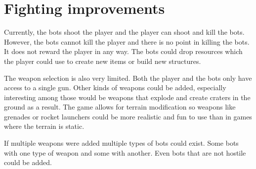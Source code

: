 \section{Fighting improvements}
Currently, the bots shoot the player and the player can shoot and kill the bots.
However, the bots cannot kill the player and there is no point in killing the bots.
It does not reward the player in any way.
The bots could drop resources which the player could use to create new items or build new structures.

The weapon selection is also very limited.
Both the player and the bots only have access to a single gun.
Other kinds of weapons could be added, especially interesting among those would be weapons that explode and create craters in the ground as a result.
The game allows for terrain modification so weapons like grenades or rocket launchers could be more realistic and fun to use than in games where the terrain is static.

If multiple weapons were added multiple types of bots could exist.
Some bots with one type of weapon and some with another.
Even bots that are not hostile could be added.